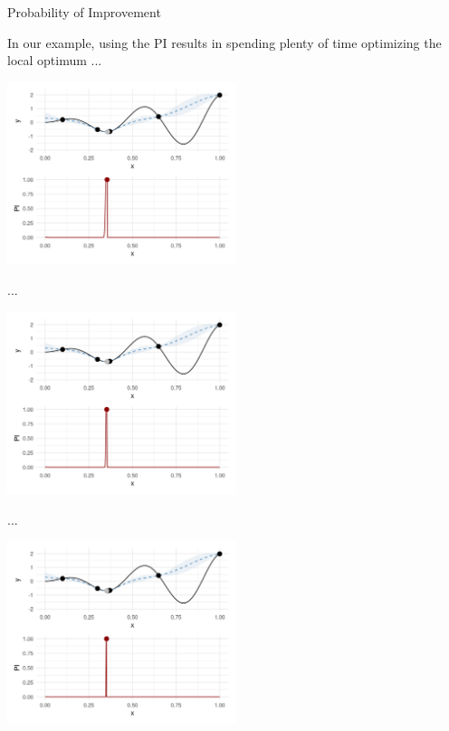 \documentclass[11pt,compress,t,notes=noshow, xcolor=table]{beamer}
\begin{document}
\begin{vbframe}{Probability of Improvement}
\framebreak

In our example, using the PI results in spending plenty of time optimizing the local optimum ...

\begin{center}
  \includegraphics[width = 0.5\textwidth]{figure_man/bayesian_loop_pi_4.png}
\end{center}

\framebreak

...

\begin{center}
  \includegraphics[width = 0.5\textwidth]{figure_man/bayesian_loop_pi_5.png}
\end{center}

\framebreak

...

\begin{center}
  \includegraphics[width = 0.5\textwidth]{figure_man/bayesian_loop_pi_6.png}
\end{center}


\end{vbframe}
\end{document}
